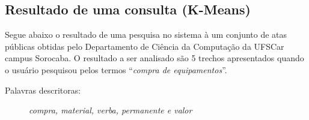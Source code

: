 
\newpage


\subsection*{Resultado de uma consulta (K-Means)}


Segue abaixo o resultado de uma pesquisa no sistema à um conjunto de atas públicas obtidas pelo Departamento de Ciência da Computação da UFSCar campus Sorocaba. O resultado a ser analisado são 5 trechos apresentados quando o usuário pesquisou pelos termos ``\textit{compra de equipamentos}''.

\vspace{0.5 cm}


\begin{description}
\item[Palavras descritoras: ] \textit{compra, material, verba, permanente e valor}
\end{description}


